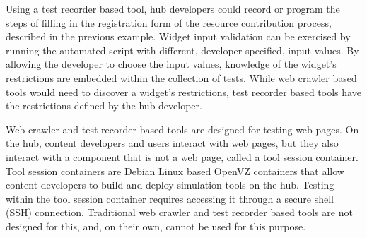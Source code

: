 Using a test recorder based tool, hub developers could record or program the
steps of filling in the registration form of the resource contribution process,
described in the previous example. Widget input validation can be exercised by
running the automated script with different, developer specified, input values.
By allowing the developer to choose the input values, knowledge of the widget's
restrictions are embedded within the collection of tests. While web crawler
based tools would need to discover a widget's restrictions, test recorder based
tools have the restrictions defined by the hub developer.

Web crawler and test recorder based tools are designed for
testing web pages. On the hub, content developers and users interact with web
pages, but they also interact with a component that is not a web page, called a
tool session container. Tool session containers are Debian Linux based OpenVZ
containers that allow content developers to build and deploy simulation tools
on the hub. Testing within the tool session container requires accessing it
through a secure shell (SSH) connection. Traditional web crawler and
test recorder based tools are not designed for this, and, on their
own, cannot be used for this purpose.


